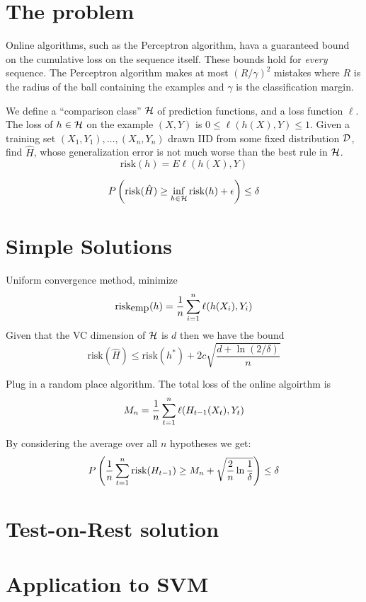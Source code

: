 \documentclass{report}
\theoremstyle{plain}
\theoremstyle{definition}
\begin{document}
\lecturer{}
\scribe{}

\maketitle

\section{The problem}
Online algorithms, such as the Perceptron algorithm, hava a guaranteed
bound on the cumulative loss on the sequence itself. These bounds hold
for {\em every} sequence. The Perceptron algorithm makes at most
$(R/\gamma)^2$ mistakes where $R$ is the radius of the ball containing
the examples and $\gamma$ is the classification margin.

We define a ``comparison class'' $\cal H$ of prediction functions, and
a loss function $\ell$. The loss of $h \in \cal H$ on the example
$(X,Y)$ is $0 \leq \ell(h(X),Y) \leq 1$. Given a training set
$(X_1,Y_1),\ldots,(X_n,Y_n)$ drawn IID from some fixed distribution
$\cal D$, find $\widehat{H}$, whose generalization error is not much
worse than the best rule in $\cal H$.
\newcommand{\risk}{\mbox{risk}}
\newcommand{\riskemp}{\risk_{\mbox{emp}}}
\[
\risk(h) = E \ell(h(X),Y)
\]

\[
P\left( \risk(\hat{H}) \geq \inf_{h \in \cal H} \risk(h) + \epsilon  \right) \leq \delta
\]

\section{Simple Solutions}

Uniform convergence method, minimize
\[
\riskemp(h) = {1 \over n} \sum_{i=1}^n \ell(h(X_i),Y_i)
\]
 Given that the VC dimension of $\cal H$ is $d$ then we have the bound
\[
\risk(\hat{H}) \leq \risk(h^*) + 2c \sqrt{\frac{d+\ln(2/\delta)}{n}}
\]

Plug in a random place algorithm. The total loss of the online
algoirthm is
\[
M_n = {1 \over n} \sum_{t=1}^n \ell(H_{t-1}(X_t),Y_t)
\]

By considering the average over all $n$ hypotheses we get:
\[
P \left( \frac{1}{n} \sum_{t=1}^n \risk(H_{t-1})  \geq M_n + \sqrt{{2
      \over n} \ln {1 \over \delta}} \right) \leq \delta
\]

\section{Test-on-Rest solution}

\section{Application to SVM}
\end{document}
